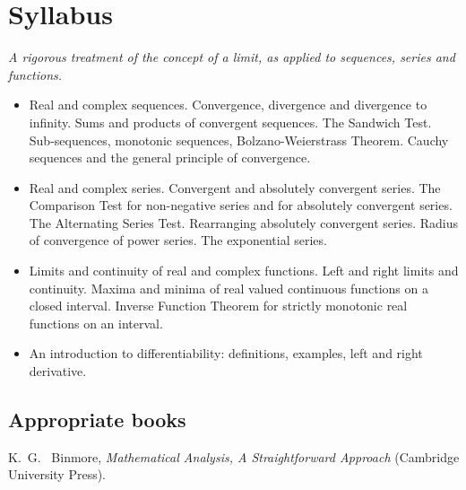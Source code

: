 \documentclass[twoside]{scrartcl}
\begin{document}
{\pagebreak 
\thispagestyle{empty}


\section*{Syllabus}  

\textit{A rigorous treatment of the concept of a limit, as applied to sequences, series and functions.}
\begin{itemize}
\item  Real and complex sequences. Convergence, divergence and divergence to infinity. Sums and products of convergent sequences. The Sandwich Test. Sub-sequences, monotonic sequences, Bolzano-Weierstrass Theorem. Cauchy sequences and the general principle of convergence.

\item Real and complex series. Convergent and absolutely convergent series. The Comparison Test for non-negative series and for absolutely convergent series. The Alternating Series Test.  Rearranging absolutely convergent series. Radius of convergence of power series. The exponential series.

\item Limits and continuity of real and complex functions. Left and right limits and continuity. Maxima
and minima of real valued continuous functions on a closed interval. Inverse Function Theorem for
strictly monotonic real functions on an interval. 

\item  An introduction to differentiability: definitions, examples, left and right derivative.
\end{itemize}
\subsection*{Appropriate books}

{\shortskip

K.~G.~ Binmore, \textit{Mathematical Analysis, A Straightforward Approach} (Cambridge University Press).

}

}





\TableofContents
\end{document}
